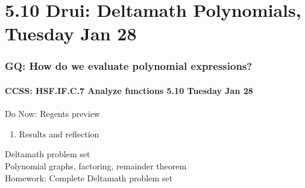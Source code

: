 \documentclass{beamer}
\begin{document}
  \section{5.10 Drui: Deltamath Polynomials, Tuesday Jan 28}
    \frame
    {
      \frametitle{GQ: How do we evaluate polynomial expressions?}
      \framesubtitle{CCSS: HSF.IF.C.7 Analyze functions    \alert{5.10 Tuesday Jan 28}}

      \begin{block}{Do Now: Regents preview}
        \begin{enumerate}
          \item Results and reflection
        \end{enumerate}
      \end{block}
      Deltamath problem set\\
      Polynomial graphs, factoring, remainder theorem \\ \bigskip
      Homework: Complete Deltamath problem set
    }
\end{document}
